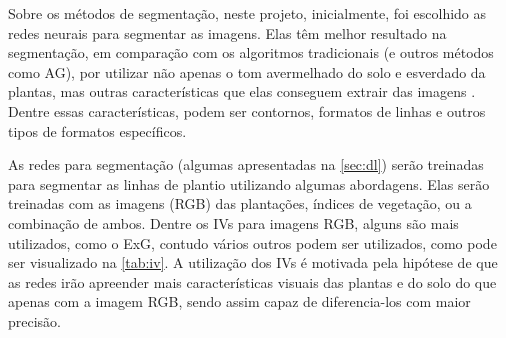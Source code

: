 \documentclass[12pt, a4paper, english, brazil]{article}
\begin{document}
Sobre os métodos de segmentação, neste projeto, inicialmente, foi escolhido as redes neurais para segmentar as imagens. Elas têm melhor resultado na segmentação, em comparação com os algoritmos tradicionais (e outros métodos como AG), por utilizar não apenas o tom avermelhado do solo e esverdado da plantas, mas outras características que elas conseguem extrair das imagens \cite{Silva_2020}. Dentre essas características, podem ser contornos, formatos de linhas e outros tipos de formatos específicos. 

As redes para segmentação (algumas apresentadas na \autoref{sec:dl}) serão treinadas para segmentar as linhas de plantio utilizando algumas abordagens. Elas serão treinadas com as imagens (RGB) das plantações, índices de vegetação, ou a combinação de ambos. Dentre os IVs para imagens RGB, alguns são mais utilizados, como o ExG, contudo vários outros podem ser utilizados, como pode ser visualizado na \autoref{tab:iv}. A utilização dos IVs é motivada pela hipótese de que as redes irão apreender mais características visuais das plantas e do solo do que apenas com a imagem RGB, sendo assim capaz de diferencia-los com maior precisão.
\end{document}
